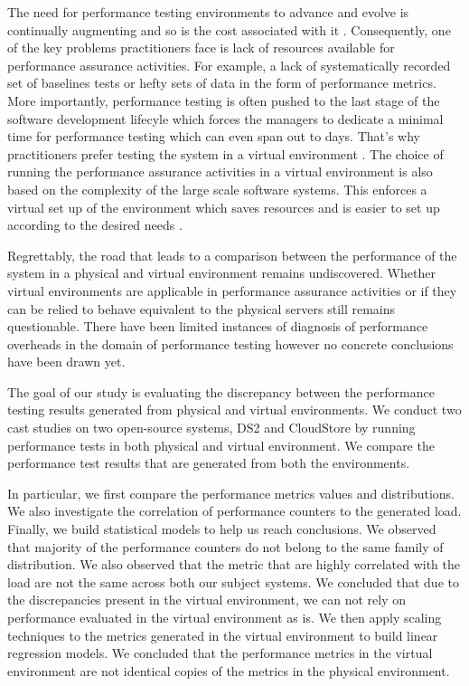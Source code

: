 The need for performance testing environments to advance and evolve is continually augmenting and so is the cost associated with it \cite{stpmag} \cite{bertolino2007software}. Consequently, one of the key problems practitioners face is lack of resources available for performance assurance activities\cite{5306331}. For example, a lack of systematically recorded set of baselines tests or hefty sets of data in the form of performance metrics. More importantly, performance testing is often pushed to the last stage of the software development lifecyle which forces the managers to dedicate a minimal time for performance testing which can even span out to days. That's why practitioners prefer testing the system in a virtual environment \cite{whyvirtualisbetter}\cite{vmwarehighcost}. The choice of running the performance assurance activities in a virtual environment is also based on the complexity of the large scale software systems. This enforces a virtual set up of the environment which saves resources and is easier to set up according to the desired needs \cite{VMWarePowerCLIBlog}\cite{seetharaman2006test}. 

Regrettably, the road that leads to a comparison between the performance of the system in a physical and virtual environment remains undiscovered. Whether virtual environments are applicable in performance assurance activities or if they can be relied to behave equivalent to the physical servers still remains questionable. There have been limited instances of diagnosis of performance overheads \cite{menon2005diagnosing} in the domain of performance testing however no concrete conclusions have been drawn yet. 

The goal of our study is evaluating the discrepancy between the performance testing results generated from physical and virtual environments. 
We conduct two cast studies on two open-source systems, DS2\cite{delldvd} and CloudStore \cite{cloudstore} by running performance tests in both physical and virtual environment. We compare the performance test results that are generated from both the environments.

In particular, we first compare the performance metrics values and distributions. We also investigate the correlation of performance counters to the generated load. Finally, we build statistical models to help us reach conclusions. 
We observed that majority of the performance counters do not belong to the same family of distribution. We also observed that the metric that are highly correlated with the load are not the same across both our subject systems.
We concluded that due to the discrepancies present in the virtual environment, we can not rely on performance evaluated in the virtual environment as is. We then apply scaling techniques to the metrics generated in the virtual environment to build linear regression models. We concluded that the performance metrics in the virtual environment are not identical copies of the metrics in the physical environment. 


